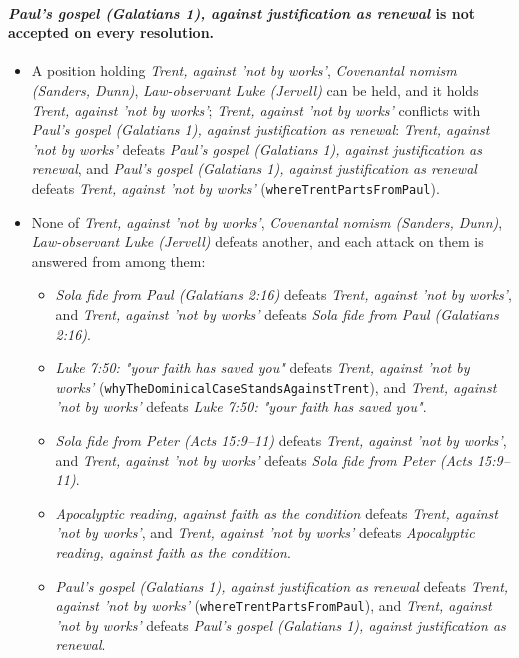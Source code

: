 \documentclass[11pt]{article}
\begin{document}
\paragraph{\emph{Paul's gospel (Galatians 1), against justification as renewal} is not accepted on every resolution.}
\begin{itemize}
\item A position holding \emph{Trent, against 'not by works'}, \emph{Covenantal nomism (Sanders, Dunn)}, \emph{Law-observant Luke (Jervell)} can be held, and it holds \emph{Trent, against 'not by works'}; \emph{Trent, against 'not by works'} conflicts with \emph{Paul's gospel (Galatians 1), against justification as renewal}: \emph{Trent, against 'not by works'} defeats \emph{Paul's gospel (Galatians 1), against justification as renewal}, and \emph{Paul's gospel (Galatians 1), against justification as renewal} defeats \emph{Trent, against 'not by works'} (\texttt{where\allowbreak{}Trent\allowbreak{}Parts\allowbreak{}From\allowbreak{}Paul}).
\item None of \emph{Trent, against 'not by works'}, \emph{Covenantal nomism (Sanders, Dunn)}, \emph{Law-observant Luke (Jervell)} defeats another, and each attack on them is answered from among them:
\begin{itemize}
\item \emph{Sola fide from Paul (Galatians 2:16)} defeats \emph{Trent, against 'not by works'}, and \emph{Trent, against 'not by works'} defeats \emph{Sola fide from Paul (Galatians 2:16)}.
\item \emph{Luke 7:50: "your faith has saved you"} defeats \emph{Trent, against 'not by works'} (\texttt{why\allowbreak{}The\allowbreak{}Dominical\allowbreak{}Case\allowbreak{}Stands\allowbreak{}Against\allowbreak{}Trent}), and \emph{Trent, against 'not by works'} defeats \emph{Luke 7:50: "your faith has saved you"}.
\item \emph{Sola fide from Peter (Acts 15:9–11)} defeats \emph{Trent, against 'not by works'}, and \emph{Trent, against 'not by works'} defeats \emph{Sola fide from Peter (Acts 15:9–11)}.
\item \emph{Apocalyptic reading, against faith as the condition} defeats \emph{Trent, against 'not by works'}, and \emph{Trent, against 'not by works'} defeats \emph{Apocalyptic reading, against faith as the condition}.
\item \emph{Paul's gospel (Galatians 1), against justification as renewal} defeats \emph{Trent, against 'not by works'} (\texttt{where\allowbreak{}Trent\allowbreak{}Parts\allowbreak{}From\allowbreak{}Paul}), and \emph{Trent, against 'not by works'} defeats \emph{Paul's gospel (Galatians 1), against justification as renewal}.

\end{itemize}
\end{itemize}
\end{document}
